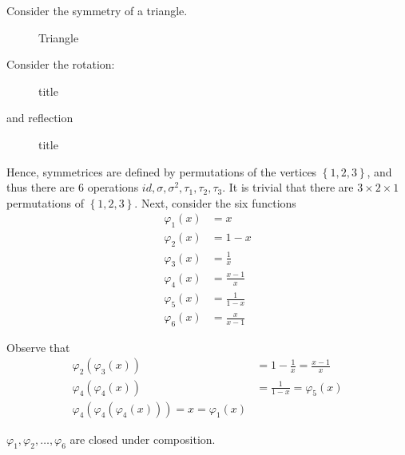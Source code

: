 Consider the symmetry of a triangle. 
\begin{figure}[H]
    \centering
    \caption{Triangle}
    \label{fig:triangle}
\end{figure}
Consider the rotation:
\begin{figure}[H]
    \centering
    \caption{title}
    \label{fig:TraingleRotate}
\end{figure}
and reflection
\begin{figure}[H]
    \centering
    \caption{title}
    \label{fig:TriangleReflection}
\end{figure}
Hence, symmetrices are defined by permutations of the vertices \(\left\{ 1,2,3 \right\} \), and thus there are \(6\) operations \(id, \sigma , \sigma ^2, \tau_1, \tau_2, \tau_3\). It is trivial that there are \(3 \times 2 \times 1\) permutations of \(\left\{ 1, 2, 3 \right\} \). Next, consider the six functions 
\begin{align*}
    \varphi _1(x) &= x \\
    \varphi _2(x) &= 1-x \\
    \varphi _3(x) &= \frac{1}{x} \\
    \varphi _4(x) &= \frac{x-1}{x} \\
    \varphi _5(x) &= \frac{1}{1-x} \\
    \varphi _6(x) &= \frac{x}{x-1}
\end{align*}  

Observe that 
\begin{align*}
    \varphi _2 \left( \varphi _3(x) \right) &= 1 - \frac{1}{x} = \frac{x-1}{x} \\
    \varphi _4\left( \varphi _4(x) \right) &= \frac{1}{1-x} = \varphi _5(x) \\
    \varphi _4 \left( \varphi _4 \left( \varphi _4(x) \right)  \right) = x = \varphi_1 (x)  
\end{align*}

\begin{theorem}
    \(\varphi _1, \varphi _2, \dots , \varphi _6\) are closed under composition.
\end{theorem}

